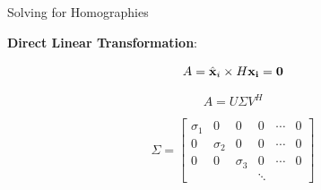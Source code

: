 \documentclass{beamer}
\begin{document}
\begin{frame}[t]{\sc Solving for Homographies}

\textbf{Direct Linear Transformation}:

\begin{center}

\vskip -0.15in
\begin{equation}
\label{DLT}
	A=\hat{\bf{x}}_{i} \times H \bf{x}_{i}=0
\end{equation}

\begin{equation}
\label{DLTSVD}
	A=U \Sigma V^{H}
\end{equation}

\begin{equation}
\label{SVD}
	\Sigma = \begin{bmatrix}\sigma_{1}&0&0&0&\cdots&0 \\ 0&\sigma_{2}&0&0&\cdots&0 \\ 0&0&\sigma_{3}&0&\cdots&0 \\ &&&\ddots&& \end{bmatrix}
\end{equation}

\end{center}

\end{frame}
\end{document}
